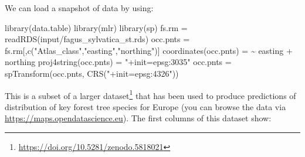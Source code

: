 \documentclass[
  graybox,natbib,nospthms]{svmono}
\newenvironment{Shaded}{\begin{snugshade}}{\end{snugshade}}
\newcommand{\ErrorTok}[1]{\textcolor[rgb]{0.14,0.14,0.14}{\textbf{#1}}}
\newcommand{\FunctionTok}[1]{\textcolor[rgb]{0,0,0}{#1}}
\newcommand{\NormalTok}[1]{#1}
\newcommand{\OtherTok}[1]{\textcolor[rgb]{0.37,0.37,0.37}{#1}}
\newcommand{\SpecialCharTok}[1]{\textcolor[rgb]{0,0,0}{#1}}
\newcommand{\StringTok}[1]{\textcolor[rgb]{0.5,0.5,0.5}{#1}}
\renewcommand{\href}[2]{#2 (\url{#1})}
\renewcommand{\href}[2]{#2\footnote{\url{#1}}}
\begin{document}
We can load a snapshot of data by using:

\begin{Shaded}
\begin{Highlighting}[]
\FunctionTok{library}\NormalTok{(data.table)}
\FunctionTok{library}\NormalTok{(mlr)}
\FunctionTok{library}\NormalTok{(sp)}
\NormalTok{fs.rm }\OtherTok{=} \FunctionTok{readRDS}\NormalTok{(}\StringTok{\textquotesingle{}input/fagus\_sylvatica\_st.rds\textquotesingle{}}\NormalTok{)}
\NormalTok{occ.pnts }\OtherTok{=}\NormalTok{ fs.rm[,}\FunctionTok{c}\NormalTok{(}\StringTok{"Atlas\_class"}\NormalTok{,}\StringTok{"easting"}\NormalTok{,}\StringTok{"northing"}\NormalTok{)]}
\FunctionTok{coordinates}\NormalTok{(occ.pnts) }\OtherTok{=} \ErrorTok{\textasciitilde{}}\NormalTok{ easting }\SpecialCharTok{+}\NormalTok{ northing}
\FunctionTok{proj4string}\NormalTok{(occ.pnts) }\OtherTok{=} \StringTok{"+init=epsg:3035"}
\NormalTok{occ.pnts }\OtherTok{=} \FunctionTok{spTransform}\NormalTok{(occ.pnts, }\FunctionTok{CRS}\NormalTok{(}\StringTok{"+init=epsg:4326"}\NormalTok{))}
\end{Highlighting}
\end{Shaded}

This is a subset of a \href{https://doi.org/10.5281/zenodo.5818021}{larger
dataset} that
has been used to produce predictions of distribution of key forest tree
species for Europe (you can browse the data via \url{https://maps.opendatascience.eu}).
The first columns of this dataset show:
\end{document}
